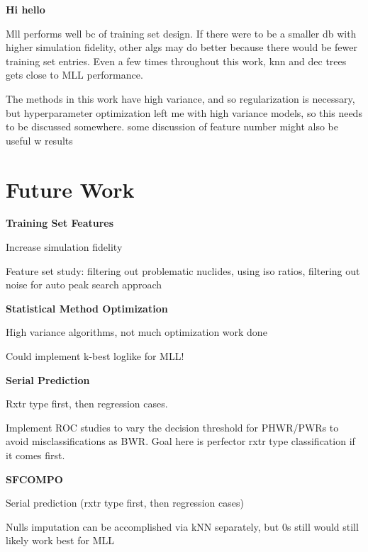 \noindent \textbf{Hi hello}

Mll performs well bc of training set design. If there were to be a smaller db
with higher simulation fidelity, other algs may do better because there would
be fewer training set entries. Even a few times throughout this work, knn and
dec trees gets close to MLL performance.

The methods in this work have high variance, and so regularization is necessary,
but hyperparameter optimization left me with high variance models, so this
needs to be discussed somewhere. some discussion of feature number might
also be useful w results

\section{Future Work}
\label{sec:future}

\noindent \textbf{Training Set Features}

Increase simulation fidelity

Feature set study: filtering out problematic nuclides, using iso ratios, filtering out noise for auto peak search approach

\noindent \textbf{Statistical Method Optimization}

High variance algorithms, not much optimization work done

Could implement k-best loglike for MLL!

\noindent \textbf{Serial Prediction}

Rxtr type first, then regression cases. 

Implement ROC studies to vary the decision threshold for PHWR/PWRs to avoid
misclassifications as BWR. Goal here is perfector rxtr type classification if
it comes first. 

\noindent \textbf{\gls{SFCOMPO}}

Serial prediction (rxtr type first, then regression cases)

Nulls imputation can be accomplished via kNN separately, but 0s still would
still likely work best for MLL

